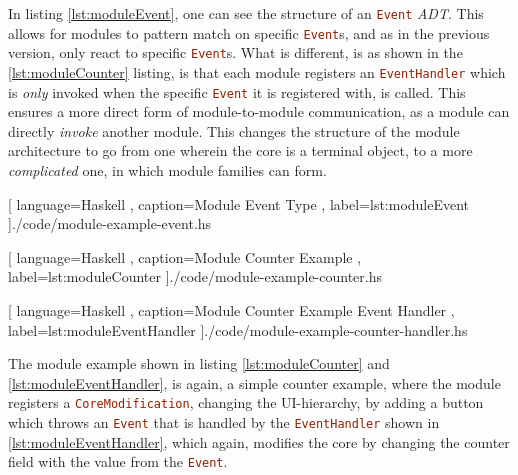 In listing \ref{lst:moduleEvent}, one can see the structure of an
\lstinline[language=Haskell]{Event} \textit{ADT}. This allows for modules to
pattern match on specific \lstinline[language=Haskell]{Event}s, and as in the
previous version, only react to specific \lstinline[language=Haskell]{Event}s.
What is different, is as shown in the \ref{lst:moduleCounter} listing, is that
each module registers an \lstinline[language=Haskell]{EventHandler} which is
\textit{only} invoked when the specific \lstinline[language=Haskell]{Event} it
is registered with, is called. This ensures a more direct form of
module-to-module communication, as a module can directly \textit{invoke} another
module. This changes the structure of the module architecture to go from one
wherein the core is a terminal object, to a more \textit{complicated} one, in
which module families can form.

\begin{center}
  
    [ language=Haskell
    , caption={Module Event Type}
    , label=lst:moduleEvent
    ]{./code/module-example-event.hs}
\end{center}

\begin{center}
  
    [ language=Haskell
    , caption={Module Counter Example}
    , label=lst:moduleCounter
    ]{./code/module-example-counter.hs}
\end{center}

\begin{center}
  
    [ language=Haskell
    , caption={Module Counter Example Event Handler}
    , label=lst:moduleEventHandler
    ]{./code/module-example-counter-handler.hs}
\end{center}

The module example shown in listing \ref{lst:moduleCounter} and
\ref{lst:moduleEventHandler}, is again, a simple counter example, where the
module registers a \lstinline[language=Haskell]{CoreModification}, changing the
UI-hierarchy, by adding a button which throws an
\lstinline[language=Haskell]{Event} that is handled by the
\lstinline[language=Haskell]{EventHandler} shown in
\ref{lst:moduleEventHandler}, which again, modifies the core by changing the
counter field with the value from the \lstinline[language=Haskell]{Event}.

